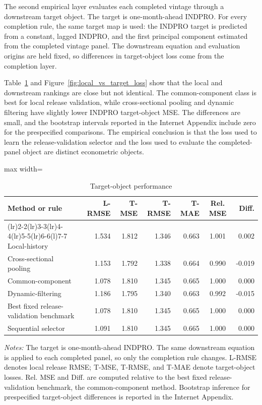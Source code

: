 \documentclass[a4paper, 12pt]{article}
\newcommand{\exhibitnote}[2][0.96\textwidth]{%
\vspace{0.65em}%
\begin{minipage}{#1}%
\footnotesize
\emph{Notes:} #2
\end{minipage}%
}
\theoremstyle{plain}
\theoremstyle{remark}
\newcommand{\1}{\mathbf{1}}
\begin{document}
The second empirical layer evaluates each completed vintage through a downstream target object. The target is one-month-ahead INDPRO. For every completion rule, the same target map is used: the INDPRO target is predicted from a constant, lagged INDPRO, and the first principal component estimated from the completed vintage panel. The downstream equation and evaluation origins are held fixed, so differences in target-object loss come from the completion layer.

Table~\ref{tab:fred_target_object} and Figure~\ref{fig:local_vs_target_loss} show that the local and downstream rankings are close but not identical. The common-component class is best for local release validation, while cross-sectional pooling and dynamic filtering have slightly lower INDPRO target-object MSE. The differences are small, and the bootstrap intervals reported in the Internet Appendix include zero for the prespecified comparisons. The empirical conclusion is that the loss used to learn the release-validation selector and the loss used to evaluate the completed-panel object are distinct econometric objects.

\begin{table}[!htbp]
\centering
\caption{Target-object performance}
\label{tab:fred_target_object}
\footnotesize
\setlength{\tabcolsep}{3.2pt}
\begin{adjustbox}{max width=\textwidth}
\begin{tabular}{@{}>{\raggedright\arraybackslash}p{}rrrrcr@{}}
\toprule
Method or rule & L-RMSE & T-MSE & T-RMSE & T-MAE & Rel. MSE & Diff. \\
\cmidrule(lr){1-1}\cmidrule(lr){2-2}\cmidrule(lr){3-3}\cmidrule(lr){4-4}\cmidrule(lr){5-5}\cmidrule(lr){6-6}\cmidrule(l){7-7}
Local-history & 1.534 & 1.812 & 1.346 & 0.663 & 1.001 & 0.002 \\
Cross-sectional pooling & 1.153 & 1.792 & 1.338 & 0.664 & 0.990 & -0.019 \\
Common-component & 1.078 & 1.810 & 1.345 & 0.665 & 1.000 & 0.000 \\
Dynamic-filtering & 1.186 & 1.795 & 1.340 & 0.663 & 0.992 & -0.015 \\
Best fixed release-validation benchmark & 1.078 & 1.810 & 1.345 & 0.665 & 1.000 & 0.000 \\
Sequential selector & 1.091 & 1.810 & 1.345 & 0.665 & 1.000 & 0.000 \\
\bottomrule
\end{tabular}
\end{adjustbox}
\exhibitnote{The target is one-month-ahead INDPRO. The same downstream equation is applied to each completed panel, so only the completion rule changes. L-RMSE denotes local release RMSE; T-MSE, T-RMSE, and T-MAE denote target-object losses. Rel. MSE and Diff. are computed relative to the best fixed release-validation benchmark, the common-component method. Bootstrap inference for prespecified target-object differences is reported in the Internet Appendix.}
\end{table}
\end{document}
